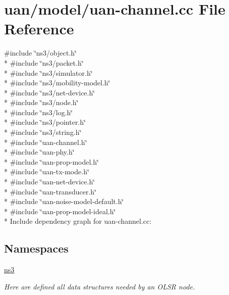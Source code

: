 \hypertarget{uan-channel_8cc}{}\section{uan/model/uan-\/channel.cc File Reference}
\label{uan-channel_8cc}
{\ttfamily \#include \char`\"{}ns3/object.\+h\char`\"{}}\\*
{\ttfamily \#include \char`\"{}ns3/packet.\+h\char`\"{}}\\*
{\ttfamily \#include \char`\"{}ns3/simulator.\+h\char`\"{}}\\*
{\ttfamily \#include \char`\"{}ns3/mobility-\/model.\+h\char`\"{}}\\*
{\ttfamily \#include \char`\"{}ns3/net-\/device.\+h\char`\"{}}\\*
{\ttfamily \#include \char`\"{}ns3/node.\+h\char`\"{}}\\*
{\ttfamily \#include \char`\"{}ns3/log.\+h\char`\"{}}\\*
{\ttfamily \#include \char`\"{}ns3/pointer.\+h\char`\"{}}\\*
{\ttfamily \#include \char`\"{}ns3/string.\+h\char`\"{}}\\*
{\ttfamily \#include \char`\"{}uan-\/channel.\+h\char`\"{}}\\*
{\ttfamily \#include \char`\"{}uan-\/phy.\+h\char`\"{}}\\*
{\ttfamily \#include \char`\"{}uan-\/prop-\/model.\+h\char`\"{}}\\*
{\ttfamily \#include \char`\"{}uan-\/tx-\/mode.\+h\char`\"{}}\\*
{\ttfamily \#include \char`\"{}uan-\/net-\/device.\+h\char`\"{}}\\*
{\ttfamily \#include \char`\"{}uan-\/transducer.\+h\char`\"{}}\\*
{\ttfamily \#include \char`\"{}uan-\/noise-\/model-\/default.\+h\char`\"{}}\\*
{\ttfamily \#include \char`\"{}uan-\/prop-\/model-\/ideal.\+h\char`\"{}}\\*
Include dependency graph for uan-\/channel.cc\+:
\subsection*{Namespaces}
\begin{DoxyCompactItemize}
\item 
 \hyperlink{namespacens3}{ns3}
\begin{DoxyCompactList}\small\item\em Here are defined all data structures needed by an O\+L\+SR node. \end{DoxyCompactList}\end{DoxyCompactItemize}
